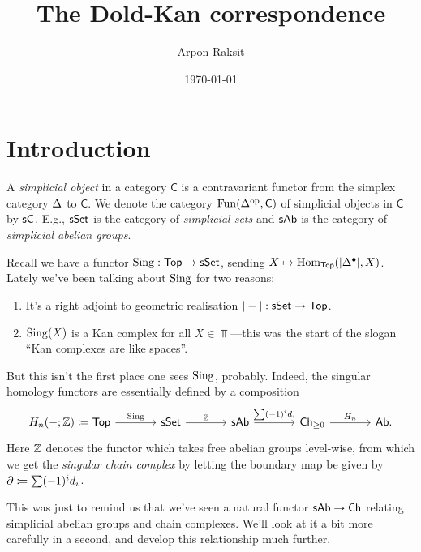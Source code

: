 


\title{The Dold-Kan correspondence}
\author{Arpon Raksit}
\date{\today}


\maketitle
\thispagestyle{fancy}


\renewcommand{\C}{\mathsf{C}}

\section{Introduction}

\begin{definition}
  A \textit{simplicial object} in a category $\C$ is a contravariant
  functor from the simplex category $\Delta$ to $\C$. We denote the
  category $\Fun(\Simplex^\op, \C)$ of simplicial objects in $\C$ by
  $\s\C$. E.g., $\mathsf{s}\mathsf{Set}$ is the category of \textit{simplicial sets}
  and $\mathsf{s}\mathsf{Ab}$ is the category of \textit{simplicial abelian groups}.
\end{definition}

Recall we have a functor $\operatorname{Sing} : \mathsf{Top} \to \mathsf{s}\mathsf{Set}$, sending $X \mapsto
\operatorname{Hom}_{\mathsf{Top}}(|\Delta^\bullet|, X)$. Lately we've been talking about
$\operatorname{Sing}$ for two reasons:
\begin{enumerate}
\item It's a right adjoint to geometric realisation $|-| : \mathsf{s}\mathsf{Set} \to
  \mathsf{Top}$.
\item $\operatorname{Sing}(X)$ is a Kan complex for all $X \in \Top$---this was the
  start of the slogan ``Kan complexes are like spaces''.
\end{enumerate}
But this isn't the first place one sees $\operatorname{Sing}$, probably. Indeed, the
singular homology functors are essentially defined by a composition
\[
\begin{tikzcd}[column sep = large]
  \H_n(-;\Z) \coloneqq \Top \rar{\Sing} & \s\Set \rar{\Z} & \s\Ab
  \rar{\sum (-1)^i d_i} & \Ch_{\ge 0} \rar{\H_n} & \Ab.
\end{tikzcd}
\]
Here $\mathbb{Z}$ denotes the functor which takes free abelian groups
level-wise, from which we get the \textit{singular chain complex} by
letting the boundary map be given by $\partial \coloneqq \sum (-1)^i d_i$.

This was just to remind us that we've seen a natural functor $\mathsf{s}\mathsf{Ab}
\to \mathsf{Ch}$ relating simplicial abelian groups and chain complexes. We'll
look at it a bit more carefully in a second, and develop this
relationship much further.

